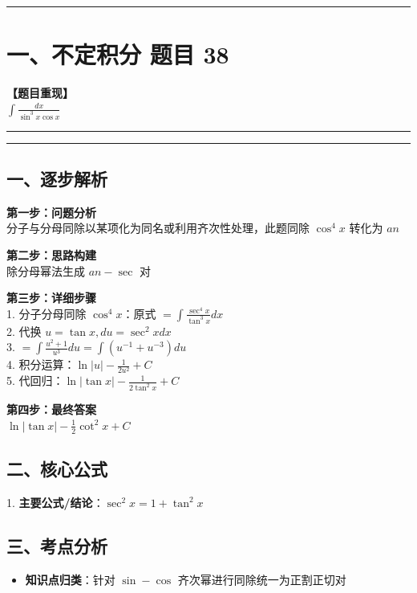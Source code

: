 ﻿\documentclass[12pt, a4paper]{ctexart}
\newcommand{\TopSeparator}{
    \par\noindent\rule{\textwidth}{1.5pt}\vspace{0.5em}
}
\newcommand{\AnalysisSeparator}{
    \par\noindent\rule{\textwidth}{0.5pt}\vspace{0.2em}\hrule\vspace{0.5em}
}
\newenvironment{RedAnalysis}{
    \par
    \color{red} 
}{
    \par
    \color{black} 
}
\begin{document}
\vspace{2em}

\TopSeparator
\section*{一、不定积分 题目 38}

\textbf{【题目重现】} \\
$\int \frac{dx}{\sin^3 x \cos x}$

\AnalysisSeparator

\begin{RedAnalysis}

	\subsection*{一、逐步解析}

	\textbf{第一步：问题分析} \\
	分子与分母同除以某项化为同名或利用齐次性处理，此题同除 $\cos^4 x$ 转化为 $	an$

	\textbf{第二步：思路构建} \\
	除分母幂法生成 $	an-\sec$ 对

	\textbf{第三步：详细步骤} \\
	1. 分子分母同除 $\cos^4 x$：原式 $= \int \frac{\sec^4 x}{\tan^3 x} dx$ \\ 
	2. 代换 $u = \tan x, du = \sec^2 x dx$ \\ 
	3. $= \int \frac{u^2+1}{u^3} du = \int (u^{-1} + u^{-3}) du$ \\ 
	4. 积分运算：$\ln|u| - \frac{1}{2u^2} + C$ \\ 
	5. 代回归：$\ln|\tan x| - \frac{1}{2\tan^2 x} + C$

	\textbf{第四步：最终答案} \\
	$\ln|\tan x| - \frac{1}{2}\cot^2 x + C$

	\subsection*{二、核心公式}
	1. \textbf{主要公式/结论}：$\sec^2 x = 1+\tan^2 x$

	\subsection*{三、考点分析}
	\begin{itemize}
		\item \textbf{知识点归类}：针对 $\sin-\cos$ 齐次幂进行同除统一为正割正切对
	\end{itemize}

\end{RedAnalysis}
\end{document}
